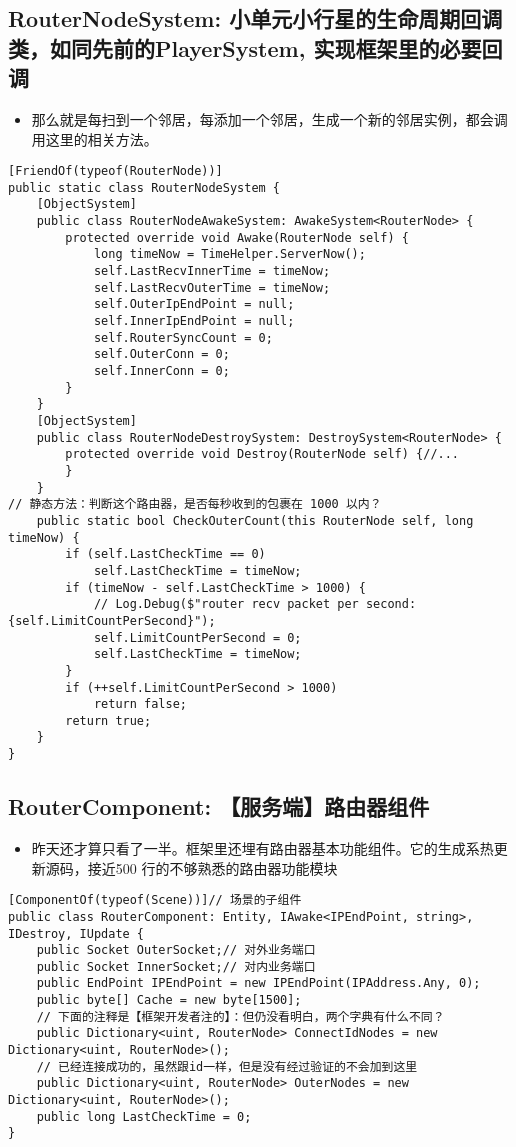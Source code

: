 \documentclass[9pt, b5paper]{article}
\begin{document}
\subsection{RouterNodeSystem: 小单元小行星的生命周期回调类，如同先前的PlayerSystem, 实现框架里的必要回调}
\label{sec-7-20}
\begin{itemize}
\item 那么就是每扫到一个邻居，每添加一个邻居，生成一个新的邻居实例，都会调用这里的相关方法。
\end{itemize}
\begin{verbatim}
[FriendOf(typeof(RouterNode))]
public static class RouterNodeSystem {
    [ObjectSystem]
    public class RouterNodeAwakeSystem: AwakeSystem<RouterNode> {
        protected override void Awake(RouterNode self) {
            long timeNow = TimeHelper.ServerNow();
            self.LastRecvInnerTime = timeNow;
            self.LastRecvOuterTime = timeNow;
            self.OuterIpEndPoint = null;
            self.InnerIpEndPoint = null;
            self.RouterSyncCount = 0;
            self.OuterConn = 0;
            self.InnerConn = 0;
        }
    }
    [ObjectSystem]
    public class RouterNodeDestroySystem: DestroySystem<RouterNode> {
        protected override void Destroy(RouterNode self) {//...
        }
    }
// 静态方法：判断这个路由器，是否每秒收到的包裹在 1000 以内？
    public static bool CheckOuterCount(this RouterNode self, long timeNow) {
        if (self.LastCheckTime == 0) 
            self.LastCheckTime = timeNow;
        if (timeNow - self.LastCheckTime > 1000) {
            // Log.Debug($"router recv packet per second: {self.LimitCountPerSecond}");
            self.LimitCountPerSecond = 0;
            self.LastCheckTime = timeNow;
        }
        if (++self.LimitCountPerSecond > 1000) 
            return false;
        return true;
    }
}
\end{verbatim}
\subsection{RouterComponent: 【服务端】路由器组件}
\label{sec-7-21}
\begin{itemize}
\item 昨天还才算只看了一半。框架里还埋有路由器基本功能组件。它的生成系热更新源码，接近500 行的不够熟悉的路由器功能模块
\end{itemize}
\begin{verbatim}
[ComponentOf(typeof(Scene))]// 场景的子组件
public class RouterComponent: Entity, IAwake<IPEndPoint, string>, IDestroy, IUpdate {
    public Socket OuterSocket;// 对外业务端口
    public Socket InnerSocket;// 对内业务端口
    public EndPoint IPEndPoint = new IPEndPoint(IPAddress.Any, 0);
    public byte[] Cache = new byte[1500];
    // 下面的注释是【框架开发者注的】：但仍没看明白，两个字典有什么不同？
    public Dictionary<uint, RouterNode> ConnectIdNodes = new Dictionary<uint, RouterNode>();
    // 已经连接成功的，虽然跟id一样，但是没有经过验证的不会加到这里
    public Dictionary<uint, RouterNode> OuterNodes = new Dictionary<uint, RouterNode>();
    public long LastCheckTime = 0;
}
\end{verbatim}
\end{document}
